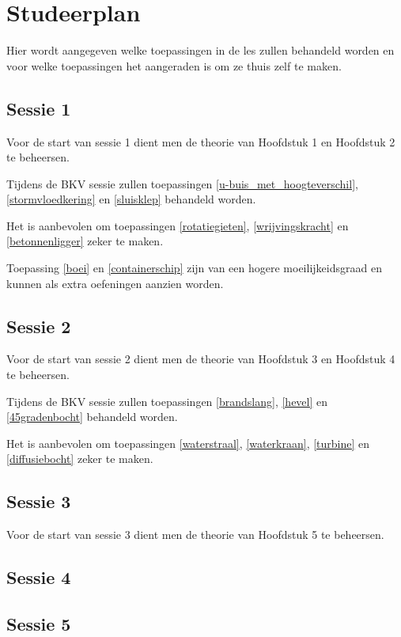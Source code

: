 \chapter{Studeerplan}
Hier wordt aangegeven welke toepassingen in de les zullen behandeld worden en voor welke toepassingen het aangeraden is om ze thuis zelf te maken.
	\section*{Sessie 1}
Voor de start van sessie 1 dient men de theorie van Hoofdstuk 1 en Hoofdstuk 2 te beheersen.

Tijdens de BKV sessie zullen toepassingen \ref{u-buis_met_hoogteverschil}, \ref{stormvloedkering} en \ref{sluisklep} behandeld worden.

Het is aanbevolen om toepassingen \ref{rotatiegieten}, \ref{wrijvingskracht} en \ref{betonnenligger} zeker te maken.

Toepassing \ref{boei} en \ref{containerschip} zijn van een hogere moeilijkeidsgraad en kunnen als extra oefeningen aanzien worden.
	
	\section*{Sessie 2}
Voor de start van sessie 2 dient men de theorie van Hoofdstuk 3 en Hoofdstuk 4 te beheersen.

Tijdens de BKV sessie zullen toepassingen \ref{brandslang}, \ref{hevel} en \ref{45gradenbocht} behandeld worden.

Het is aanbevolen om toepassingen \ref{waterstraal}, \ref{waterkraan}, \ref{turbine} en \ref{diffusiebocht} zeker te maken.

	\section*{Sessie 3}
Voor de start van sessie 3 dient men de theorie van Hoofdstuk 5 te beheersen.

	\section*{Sessie 4}
	
	\section*{Sessie 5}
	